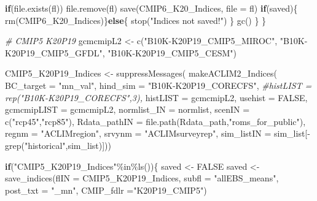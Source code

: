 \documentclass[
]{article}
\newenvironment{Shaded}{\begin{snugshade}}{\end{snugshade}}
\newcommand{\AttributeTok}[1]{\textcolor[rgb]{0.77,0.63,0.00}{#1}}
\newcommand{\CommentTok}[1]{\textcolor[rgb]{0.56,0.35,0.01}{\textit{#1}}}
\newcommand{\ConstantTok}[1]{\textcolor[rgb]{0.00,0.00,0.00}{#1}}
\newcommand{\ControlFlowTok}[1]{\textcolor[rgb]{0.13,0.29,0.53}{\textbf{#1}}}
\newcommand{\FunctionTok}[1]{\textcolor[rgb]{0.00,0.00,0.00}{#1}}
\newcommand{\NormalTok}[1]{#1}
\newcommand{\OtherTok}[1]{\textcolor[rgb]{0.56,0.35,0.01}{#1}}
\newcommand{\SpecialCharTok}[1]{\textcolor[rgb]{0.00,0.00,0.00}{#1}}
\newcommand{\StringTok}[1]{\textcolor[rgb]{0.31,0.60,0.02}{#1}}
\begin{document}
\begin{Shaded}
\begin{Highlighting}[]
      \ControlFlowTok{if}\NormalTok{(}\FunctionTok{file.exists}\NormalTok{(fl)) }\FunctionTok{file.remove}\NormalTok{(fl)}
      \FunctionTok{save}\NormalTok{(CMIP6\_K20\_Indices, }\AttributeTok{file =}\NormalTok{ fl)}
      \ControlFlowTok{if}\NormalTok{(saved)\{}
        \FunctionTok{rm}\NormalTok{(CMIP6\_K20\_Indices)\}}\ControlFlowTok{else}\NormalTok{\{}
          \FunctionTok{stop}\NormalTok{(}\StringTok{"Indices not saved!"}\NormalTok{)}
\NormalTok{        \}}
      \FunctionTok{gc}\NormalTok{()}
\NormalTok{     \}}
\NormalTok{    \}}
     
    \CommentTok{\# CMIP5 K20P19}
\NormalTok{    gcmcmipL2 }\OtherTok{\textless{}{-}} \FunctionTok{c}\NormalTok{(}\StringTok{"B10K{-}K20P19\_CMIP5\_MIROC"}\NormalTok{,}
                   \StringTok{"B10K{-}K20P19\_CMIP5\_GFDL"}\NormalTok{,}
                   \StringTok{"B10K{-}K20P19\_CMIP5\_CESM"}\NormalTok{)}
    
\NormalTok{    CMIP5\_K20P19\_Indices }\OtherTok{\textless{}{-}} \FunctionTok{suppressMessages}\NormalTok{(}
                        \FunctionTok{makeACLIM2\_Indices}\NormalTok{(}
                        \AttributeTok{BC\_target =} \StringTok{"mn\_val"}\NormalTok{,}
                        \AttributeTok{hind\_sim  =}  \StringTok{"B10K{-}K20P19\_CORECFS"}\NormalTok{,}
                        \CommentTok{\#histLIST  = rep("B10K{-}K20P19\_CORECFS",3),}
                        \AttributeTok{histLIST  =}\NormalTok{ gcmcmipL2,}
                        \AttributeTok{usehist   =} \ConstantTok{FALSE}\NormalTok{,}
                        \AttributeTok{gcmcmipLIST =}\NormalTok{ gcmcmipL2,}
                        \AttributeTok{normlist\_IN =}\NormalTok{ normlist,}
                        \AttributeTok{scenIN    =} \FunctionTok{c}\NormalTok{(}\StringTok{"rcp45"}\NormalTok{,}\StringTok{"rcp85"}\NormalTok{),}
                        \AttributeTok{Rdata\_pathIN =} \FunctionTok{file.path}\NormalTok{(Rdata\_path,}\StringTok{"roms\_for\_public"}\NormalTok{),}
                        \AttributeTok{regnm    =} \StringTok{"ACLIMregion"}\NormalTok{,}
                        \AttributeTok{srvynm    =} \StringTok{"ACLIMsurveyrep"}\NormalTok{,}
                        \AttributeTok{sim\_listIN =}\NormalTok{ sim\_list[}\SpecialCharTok{{-}}\FunctionTok{grep}\NormalTok{(}\StringTok{"historical"}\NormalTok{,sim\_list)]))}

    \ControlFlowTok{if}\NormalTok{(}\StringTok{"CMIP5\_K20P19\_Indices"}\SpecialCharTok{\%in\%}\FunctionTok{ls}\NormalTok{())\{}
\NormalTok{      saved }\OtherTok{\textless{}{-}} \ConstantTok{FALSE}
\NormalTok{      saved }\OtherTok{\textless{}{-}} \FunctionTok{save\_indices}\NormalTok{(}\AttributeTok{flIN =}\NormalTok{ CMIP5\_K20P19\_Indices, }
                     \AttributeTok{subfl =} \StringTok{"allEBS\_means"}\NormalTok{,}
                     \AttributeTok{post\_txt =} \StringTok{"\_mn"}\NormalTok{,}
                     \AttributeTok{CMIP\_fdlr =}\StringTok{"K20P19\_CMIP5"}\NormalTok{)}
        

\end{Highlighting}
\end{Shaded}
\end{document}
